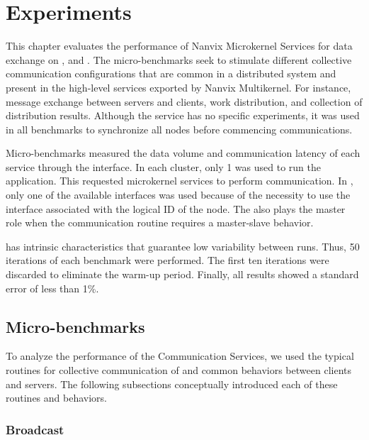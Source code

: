 \chapter{Experiments}
\label{ch.experiments}

	This chapter evaluates the performance of Nanvix Microkernel Services for
	data exchange on \mppa, \ie \mailbox and \portal. The micro-benchmarks seek to
	stimulate different collective communication configurations that are common in a
	distributed system and present in the high-level services exported by Nanvix
	Multikernel. For instance, message exchange between servers and clients, work
	distribution, and collection of distribution results. Although the \sync service
	has no specific experiments, it was used in all benchmarks to synchronize all nodes
	before commencing communications.

	Micro-benchmarks measured the data volume and communication latency of each
	service through the \ioctl interface. In each cluster, only 1 \pe was used
	to run the application. This \pe requested microkernel services to perform
	communication. In \iocluster, only one of the available interfaces was used
	because of the necessity to use the interface associated with the logical ID
	of the node. The \iocluster also plays the master role when the communication
	routine requires a master-slave behavior.

	\mppa has intrinsic characteristics that guarantee low variability between runs.
	Thus, 50 iterations of each benchmark were performed. The first ten iterations
	were discarded to eliminate the warm-up period. Finally, all results showed a
	standard error of less than 1\%.

	\section{Micro-benchmarks}

		To analyze the performance of the Communication Services, we used the typical
		routines for collective communication of \mpi and common behaviors between
		clients and servers. The following subsections conceptually introduced each
		of these routines and behaviors.

		\subsection{Broadcast}

